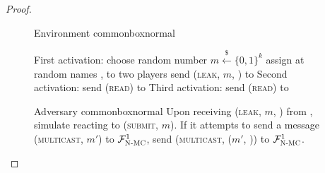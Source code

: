 \begin{proof}
\begin{figure}[H]
\begin{titlebox}{Environment \normalfont \perfectenv}{commonbox}{normal}
\begin{algorithmic}[1]
            \State First activation:
            \Indent
              \State choose random number $m \overset{\$}{\gets} \{0, 1\}^k$
              \State assign at random names \alice, \bob{} to two players
              \State send (\textsc{leak}, $m$, \alice) to \adversary{}
            \EndIndent
            \State Second activation:
            \Indent
              \State send (\textsc{read}) to \bob
            \EndIndent
            \State Third activation:
            \Indent
                \State {} 
                \label{fig:perfectledger:env:coin1:real1}
                \State {} 
                \label{fig:perfectledger:env:coin1:ideal1}
              \EndIf
              \State send (\textsc{read}) to \alice
                \State {} 
                \label{fig:perfectledger:env:coin1:real3}
                \State {} 
                \label{fig:perfectledger:env:coin1:real2}
                \State {} 
                \label{fig:perfectledger:env:coin1:ideal2}
              \EndIf
            \EndIndent
          \EndProcedure
        \end{algorithmic}
      \end{titlebox}
      \caption{}
      \label{fig:perfectledger:env}
    \end{figure}

    \begin{figure}[H]
      \begin{titlebox}{Adversary \normalfont \perfectadv}{commonbox}{normal}
        Upon receiving (\textsc{leak}, $m$, \alice) from \perfectenv, simulate
        \perfectprot{} reacting to (\textsc{submit}, $m$). If it attempts to
        send a message (\textsc{multicast}, $m'$) to $\mathcal{F}_{\textsc{N-MC}}^1$, send
        (\textsc{multicast}, ($m'$, \alice)) to $\mathcal{F}_{\textsc{N-MC}}^1$.
      \end{titlebox}
      \caption{}
      \label{fig:perfectledger:adv}
    \end{figure}


\end{proof}
